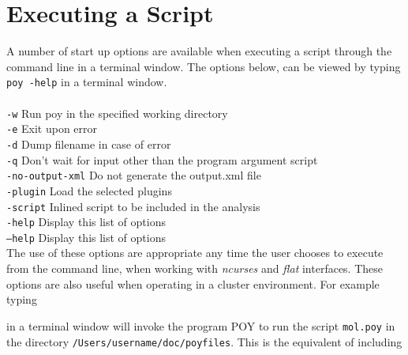 \section {Executing a Script}
\label {sec: Executing a Script}
A number of start up options are available when executing a script through the command line in a 
terminal window. The options below, can be viewed by typing \texttt{poy -help} in a terminal window.\\
\\
  \texttt{-w} \hspace{0.25 cm} Run poy in the specified working directory\\
  \texttt{-e}  \hspace{0.25 cm} Exit upon error\\
  \texttt{-d}  \hspace{0.25 cm} Dump filename in case of error\\
  \texttt{-q}  \hspace{0.25 cm} Don't wait for input other than the program argument script\\
  \texttt{-no-output-xml}  \hspace{0.25 cm} Do not generate the output.xml file\\
  \texttt{-plugin}  \hspace{0.25 cm} Load the selected plugins\\
  \texttt{-script}  \hspace{0.25 cm} Inlined script to be included in the analysis\\
  \texttt{-help}  \hspace{0.25 cm} Display this list of options\\
  \texttt{--help}  \hspace{0.25 cm} Display this list of options\\
  
The use of these options are appropriate any time the user chooses to execute \poy from the command line,  when 
working with \emph{ncurses} and \emph{flat} interfaces. These options are also useful when operating \poy in a cluster environment. 
For example typing

\begin{quote}
\end{quote}
in a terminal window will invoke the program POY to run the script \texttt{mol.poy} in the directory 
\texttt{/Users/username/doc/poyfiles}.  This is the equivalent of including

